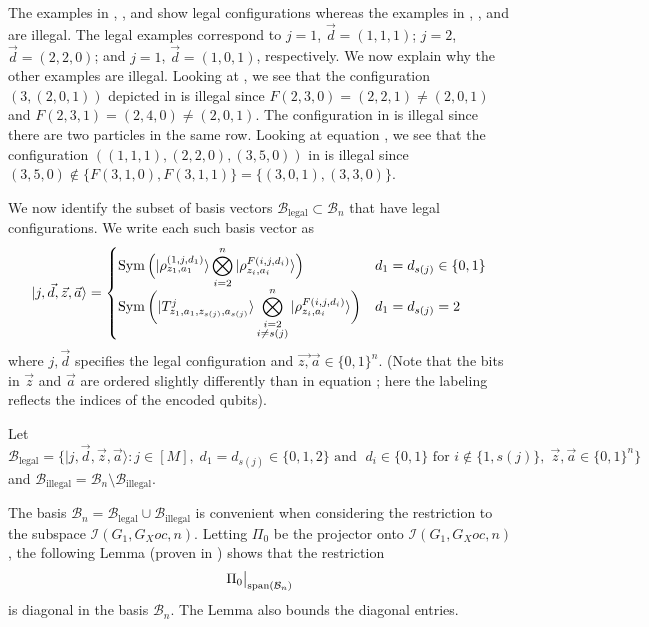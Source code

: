 \documentclass[../thesis-main/thesis-main]{subfiles}
\begin{document}
The examples in , , and  show legal configurations whereas the examples in , , and  are illegal.  The legal examples correspond to $j=1$, $\vec d=(1,1,1)$; $j=2$, $\vec d=(2,2,0)$; and $j=1$, $\vec d=(1,0,1)$, respectively.  We now explain why the other examples are illegal. Looking at , we see that the configuration $(3,(2,0,1))$ depicted in  is illegal since $F(2,3,0)=(2,2,1) \neq (2,0,1)$ and $F(2,3,1)=(2,4,0) \neq (2,0,1)$. The configuration in  is illegal since there are two particles in the same row. Looking at equation , we see that the configuration $((1,1,1),(2,2,0),(3,5,0))$ in  is illegal since $(3,5,0)\notin \{F(3,1,0),F(3,1,1)\} = \{(3,0,1),(3,3,0)\}$.

We now identify the subset of basis vectors $\mathcal{B}_{\text{legal}}\subset\mathcal{B}_{n}$ that have legal configurations. We write each such basis vector as
\begin{equation}
|j,\vec{d},\vec{z},\vec{a}\rangle=\begin{cases}
\operatorname{Sym}\Big(|\rho_{z_{1},a_{1}}^{(1,j,d_{1})}\rangle\displaystyle\bigotimes_{i=2}^{n}|\rho_{z_{i},a_{i}}^{F(i,j,d_{i})}\rangle\Big) & d_{1}=d_{s(j)}\in\{0,1\}\\
\operatorname{Sym}\bigg(|T_{z_{1},a_{1},z_{s(j)},a_{s(j)}}^{j}\rangle\displaystyle\bigotimes_{\substack{i=2\\i\neq s(j)}}^n |\rho_{z_{i},a_{i}}^{F(i,j,d_{i})}\rangle\bigg) & d_{1}=d_{s(j)}=2
\end{cases}\label{eq:legal_states}
\end{equation}
where $j,\vec{d}$ specifies the legal configuration and $\vec{z,}\vec{a}\in\{0,1\}^{n}$. (Note that the bits in $\vec{z}$ and $\vec{a}$ are ordered slightly differently than in equation ; here the labeling reflects the indices of the encoded qubits). 

\begin{definition}
Let 
\[
\mathcal{B}_{\text{legal}}=\big\{ |j,\vec{d},\vec{z},\vec{a}\rangle\colon j\in [M],\; d_{1}=d_{s(j)}\in\{0,1,2\}\text{ and }\; d_{i}\in\{0,1\}\text{ for }i\notin\{1,s(j)\},\;\vec{z},\vec{a}\in\{0,1\}^{n}\big\} 
\]
 and $\mathcal{B}_{\text{illegal}}=\mathcal{B}_{n}\setminus\mathcal{B}_{\text{illegal}}.$ 
\end{definition}

The basis $\mathcal{B}_{n}=\mathcal{B}_{\text{legal}}\cup\mathcal{B}_{\text{illegal}}$ is convenient when considering the restriction to the subspace $\mathcal{I}(G_{1},G_Xoc,n)$. Letting $\Pi_{0}$ be the projector onto $\mathcal{I}(G_{1},G_Xoc,n)$, the following Lemma (proven in ) shows that the restriction 
\begin{equation}
\Pi_{0}\big|_{\operatorname{span}(\mathcal{B}_{n})}\label{eq:restrictionBn}
\end{equation}
is diagonal in the basis $\mathcal{B}_n$. The Lemma also bounds the diagonal entries.
\end{document}
